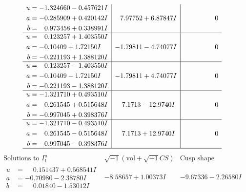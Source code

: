 \documentclass[1p]{elsarticle_modified}
\theoremstyle{definition}
\newcommand{\I}{\sqrt{-1}}
\begin{document}
$$\begin{array}{c|c|c}
\begin{aligned}
u &= -1.324660 - 0.457621 I \\
a &= -0.285909 + 0.420142 I \\
b &= \phantom{-}0.973458 + 0.338991 I\end{aligned}
 & \phantom{-}7.97752 + 6.87847 I & \phantom{-0.000000 } 0 \\ \hline\begin{aligned}
u &= \phantom{-}0.123257 + 1.403550 I \\
a &= -0.10409 + 1.72150 I \\
b &= -0.221193 + 1.388120 I\end{aligned}
 & -1.79811 - 4.74077 I & \phantom{-0.000000 } 0 \\ \hline\begin{aligned}
u &= \phantom{-}0.123257 - 1.403550 I \\
a &= -0.10409 - 1.72150 I \\
b &= -0.221193 - 1.388120 I\end{aligned}
 & -1.79811 + 4.74077 I & \phantom{-0.000000 } 0 \\ \hline\begin{aligned}
u &= -1.321710 + 0.493510 I \\
a &= \phantom{-}0.261545 + 0.515648 I \\
b &= -0.997045 + 0.398376 I\end{aligned}
 & \phantom{-}7.1713 - 12.9740 I & \phantom{-0.000000 } 0 \\ \hline\begin{aligned}
u &= -1.321710 - 0.493510 I \\
a &= \phantom{-}0.261545 - 0.515648 I \\
b &= -0.997045 - 0.398376 I\end{aligned}
 & \phantom{-}7.1713 + 12.9740 I & \phantom{-0.000000 } 0\\
 \hline 
 \end{array}$$\newpage$$\begin{array}{c|c|c}  
\text{Solutions to }I^u_{1}& \I (\text{vol} + \sqrt{-1}CS) & \text{Cusp shape}\\
 \hline 
\begin{aligned}
u &= \phantom{-}0.151437 + 0.568541 I \\
a &= -0.70980 - 2.38780 I \\
b &= \phantom{-}0.01840 - 1.53012 I\end{aligned}
 & -8.58657 + 1.00373 I & -9.67336 - 2.26580 I \\ \hline\begin{aligned}

\end{aligned}
\end{array}$$
\end{document}
